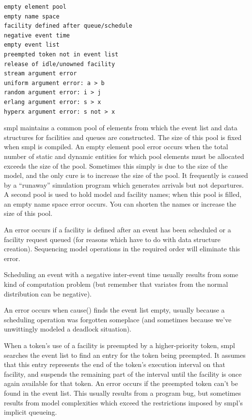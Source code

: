 \begin{verbatim}
empty element pool
empty name space
facility defined after queue/schedule
negative event time
empty event list
preempted token not in event list
release of idle/unowned facility
stream argument error
uniform argument error: a > b
random argument error: i > j
erlang argument error: s > x
hyperx argument error: s not > x
\end{verbatim}

smpl maintains a common pool of elements from which the event list and data
structures for facilities and queues are constructed. The size of this pool is
fixed when smpl is compiled. An empty element pool error occurs when the
total number of static and dynamic entities for which pool elements must be
allocated exceeds the size of the pool. Sometimes this simply is due to the
size of the model, and the only cure is to increase the size of the pool. It
frequently is caused by a ``runaway'' simulation program which generates
arrivals but not departures. A second pool is used to hold model and facility
names; when this pool is filled, an empty name space error occurs. You can
shorten the names or increase the size of this pool.

An error occurs if a facility is defined after an event has been scheduled or a
facility request queued (for reasons which have to do with data structure
creation). Sequencing model operations in the required order will eliminate
this error.

Scheduling an event with a negative inter-event time usually results from some
kind of computation problem (but remember that variates from the normal
distribution can be negative).

An error occurs when cause() finds the event list empty, usually because a
scheduling operation was forgotten someplace (and sometimes because we've
unwittingly modeled a deadlock situation).

When a token's use of a facility is preempted by a higher-priority token, smpl
searches the event list to find an entry for the token being preempted. It
assumes that this entry represents the end of the token's execution interval
on that facility, and suspends the remaining part of the interval until the
facility is once again available for that token. An error occurs if the
preempted token can't be found in the event list. This usually results from a
program bug, but sometimes results from model complexities which exceed the
restrictions imposed by smpl's implicit queueing.

